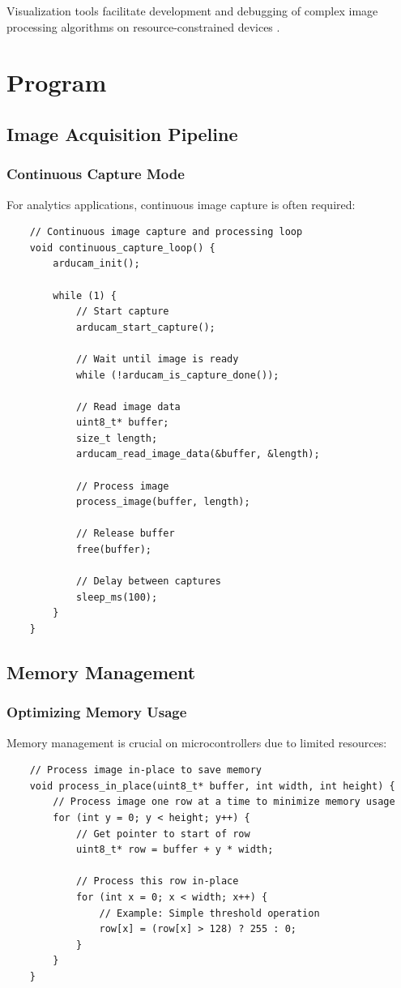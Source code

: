 Visualization tools facilitate development and debugging of complex image processing algorithms on resource-constrained devices \cite{Arducam:2023}.

\section{Program}
\subsection{Image Acquisition Pipeline}
\subsubsection{Continuous Capture Mode}
For analytics applications, continuous image capture is often required:

\begin{verbatim}
	// Continuous image capture and processing loop
	void continuous_capture_loop() {
		arducam_init();
		
		while (1) {
			// Start capture
			arducam_start_capture();
			
			// Wait until image is ready
			while (!arducam_is_capture_done());
			
			// Read image data
			uint8_t* buffer;
			size_t length;
			arducam_read_image_data(&buffer, &length);
			
			// Process image
			process_image(buffer, length);
			
			// Release buffer
			free(buffer);
			
			// Delay between captures
			sleep_ms(100);
		}
	}
\end{verbatim}



\subsection{Memory Management}
\subsubsection{Optimizing Memory Usage}
Memory management is crucial on microcontrollers due to limited resources:

\begin{verbatim}
	// Process image in-place to save memory
	void process_in_place(uint8_t* buffer, int width, int height) {
		// Process image one row at a time to minimize memory usage
		for (int y = 0; y < height; y++) {
			// Get pointer to start of row
			uint8_t* row = buffer + y * width;
			
			// Process this row in-place
			for (int x = 0; x < width; x++) {
				// Example: Simple threshold operation
				row[x] = (row[x] > 128) ? 255 : 0;
			}
		}
	}
\end{verbatim}

